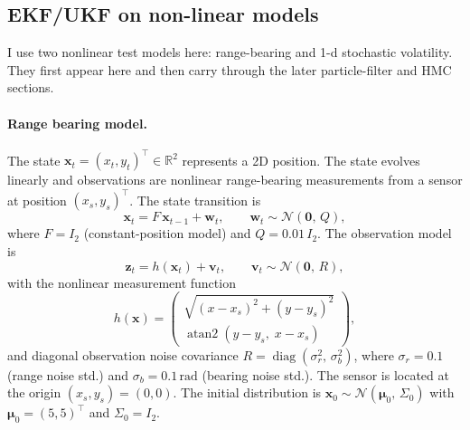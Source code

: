 \documentclass{article}
\begin{document}
\subsection{EKF/UKF on non-linear models}
\label{sec:ekf-ukf-nonlinear}
I use two nonlinear test models here: range-bearing and 1-d stochastic volatility. They first appear here and then carry through the later particle-filter and HMC sections.

\paragraph{Range bearing model.}
\label{par:range-bearing-model}
The state $\mathbf{x}_t = (x_t, y_t)^\top \in \mathbb{R}^2$ represents a 2D position. The state evolves linearly and observations are nonlinear range-bearing measurements from a sensor at position $(x_s, y_s)^\top$. The state transition is
\begin{equation}
    \mathbf{x}_t = F\,\mathbf{x}_{t-1} + \mathbf{w}_t, \qquad
    \mathbf{w}_t \sim \mathcal{N}(\mathbf{0},\, Q),
\end{equation}
where $F = I_2$ (constant-position model) and $Q = 0.01\,I_2$. The observation model is
\begin{equation}
    \mathbf{z}_t = h(\mathbf{x}_t) + \mathbf{v}_t, \qquad
    \mathbf{v}_t \sim \mathcal{N}(\mathbf{0},\, R),
\end{equation}
with the nonlinear measurement function
\begin{equation}
    h(\mathbf{x}) =
    \begin{pmatrix}
        \sqrt{(x - x_s)^2 + (y - y_s)^2} \\[4pt]
        \operatorname{atan2}(y - y_s,\; x - x_s)
    \end{pmatrix},
\end{equation}
and diagonal observation noise covariance $R = \operatorname{diag}(\sigma_r^2,\, \sigma_b^2)$, where $\sigma_r = 0.1$ (range noise std.) and $\sigma_b = 0.1\,\mathrm{rad}$ (bearing noise std.). The sensor is located at the origin $(x_s, y_s) = (0, 0)$. The initial distribution is $\mathbf{x}_0 \sim \mathcal{N}(\boldsymbol{\mu}_0,\, \Sigma_0)$ with $\boldsymbol{\mu}_0 = (5, 5)^\top$ and $\Sigma_0 = I_2$.
\end{document}
